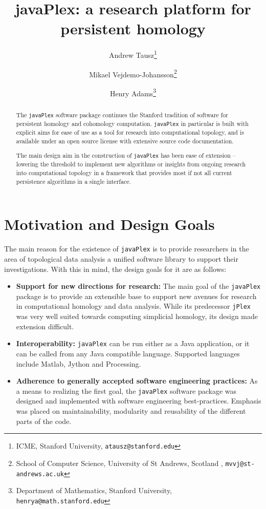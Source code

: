 \documentclass{gts2012}
\title{javaPlex: a research platform for persistent homology}
\author{Andrew Tausz\thanks{ICME,
        Stanford University, {\tt atausz@stanford.edu}}
        \and
        Mikael Vejdemo-Johansson\thanks{School of Computer Science, University of St Andrews, Scotland
          , {\tt mvvj@st-andrews.ac.uk}}
        \and Henry Adams\thanks{Department of Mathematics,
        Stanford University, {\tt henrya@math.stanford.edu}}
        }
\newcommand\jPlex{\texttt{jPlex}\xspace}
\newcommand\javaPlex{\texttt{javaPlex}\xspace}
\begin{document}
\maketitle

\begin{abstract}
The \javaPlex software package continues the Stanford tradition of software for persistent homology and cohomology computation. \javaPlex in particular is built with explicit aims for ease of use as a tool for research into computational topology, and is available under an open source license  with extensive source code documentation.

The main design aim in the construction of \javaPlex has been ease of extension -- lowering the threshold to implement new algorithms or insights from ongoing research into computational topology in a framework that provides most if not all current persistence algorithms in a single interface.

\end{abstract}

\section{Motivation and Design Goals}

The main reason for the existence of \javaPlex is to provide researchers in the area of topological data analysis a unified software library to support their investigations. With this in mind, the design goals for it are as follows:

\begin{itemize}
\item {\bf Support for new directions for research: } The main goal of the \javaPlex package is to provide an extensible base to support new avenues for research in computational homology and data analysis. While its predecessor \jPlex was very well suited towards computing simplicial homology, its design made extension difficult.
\item {\bf Interoperability: } \javaPlex can be run either as a Java application, or it can be called from any Java compatible language. Supported languages include Matlab, Jython and Processing.
\item {\bf Adherence to generally accepted software engineering practices: } As a means to realizing the first goal, the \javaPlex software package was designed and implemented with software engineering best-practices. Emphasis was placed on maintainability, modularity and reusability of the different parts of the code.
\end{itemize}
\end{document}

